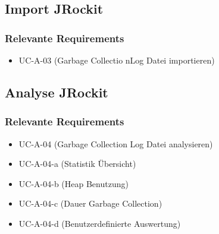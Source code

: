 \subsection{Import JRockit}
\subsubsection{Relevante Requirements}
\begin{itemize}
	\item UC-A-03 (Garbage Collectio nLog Datei importieren)
\end{itemize}

\subsection{Analyse JRockit}
\subsubsection{Relevante Requirements}
\begin{itemize}
	\item UC-A-04 (Garbage Collection Log Datei analysieren)
	\item UC-A-04-a (Statistik Übersicht)
	\item UC-A-04-b (Heap Benutzung)
	\item UC-A-04-c (Dauer Garbage Collection)
	\item UC-A-04-d (Benutzerdefinierte Auswertung)
\end{itemize}




